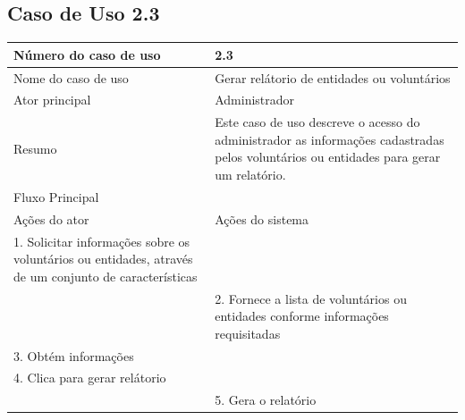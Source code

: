 \newpage

  \subsection{Caso de Uso 2.3}
    \begin{table}[h]
    \begin{center}
      \begin{tabular}{|p{5cm}|p{10cm}|}
      \hline
      Número do caso de uso & 2.3\\
      \hline
      Nome do caso de uso   & Gerar relátorio de entidades ou voluntários\\
      \hline
      Ator principal        & Administrador\\
      \hline
      Resumo                & Este caso de uso descreve o acesso do administrador as informações cadastradas pelos voluntários ou entidades para gerar um relatório.\\
      \hline
      Fluxo Principal       & \\
      \hline
      Ações do ator         & Ações do sistema \\
      \hline
      1. Solicitar informações sobre os voluntários ou entidades, através de um conjunto de características & \\ 
      \hline
      & 2. Fornece a lista de voluntários ou entidades conforme informações requisitadas\\
      \hline
      3. Obtém informações & \\
      \hline
      4. Clica para gerar relátorio & \\
      \hline
      & 5. Gera o relatório\\
      \hline
      
    \end{tabular}
    \end{center}
    \end{table}



\newpage

